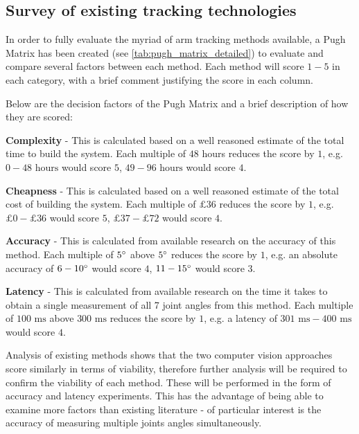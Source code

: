   \subsection{Survey of existing tracking technologies}
    In order to fully evaluate the myriad of arm tracking methods available, a Pugh Matrix has been created (see \autoref{tab:pugh_matrix_detailed}) to evaluate and compare several factors between each method.
    Each method will score \(1 - 5\) in each category, with a brief comment justifying the score in each column.
    
    Below are the decision factors of the Pugh Matrix and a brief description of how they are scored: \begin {description}
      \item \textbf{Complexity} - This is calculated based on a well reasoned estimate of the total time to build the system. Each multiple of \(48\) hours reduces the score by \(1\), e.g. \(0 - 48\text{ hours}\) would score \(5\), \(49 - 96\text{ hours}\) would score \(4\).
      \item \textbf{Cheapness} - This is calculated based on a well reasoned estimate of the total cost of building the system. Each multiple of \(£36\) reduces the score by \(1\), e.g. \(\text{£}0 - \text{£}36\) would score \(5\), \(\text{£}37 - \text{£}72\) would score \(4\).
      \item \textbf{Accuracy} - This is calculated from available research on the accuracy of this method. Each multiple of \(5 ^\circ\) above \(5 ^\circ\) reduces the score by \(1\), e.g. an absolute accuracy of \(6 - 10 ^\circ\) would score \(4\), \(11 - 15 ^\circ\) would score \(3\).
      \item \textbf{Latency} - This is calculated from available research on the time it takes to obtain a single measurement of all 7 joint angles from this method. Each multiple of \(100 \text{ ms}\) above \(300 \text{ ms}\) reduces the score by \(1\), e.g. a latency of \(301 \text{ ms} - 400 \text{ ms}\) would score \(4\).
    \end{description}

    Analysis of existing methods shows that the two computer vision approaches score similarly in terms of viability, therefore further analysis will be required to confirm the viability of each method.
    These will be performed in the form of accuracy and latency experiments.
    This has the advantage of being able to examine more factors than existing literature - of particular interest is the accuracy of measuring multiple joints angles simultaneously.
    
